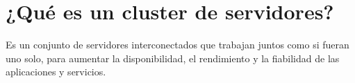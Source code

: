 \section{¿Qué es un cluster de servidores?}
Es un conjunto de servidores interconectados que trabajan juntos como si fueran uno solo, 
para aumentar la disponibilidad, el rendimiento y la fiabilidad de las aplicaciones y servicios.